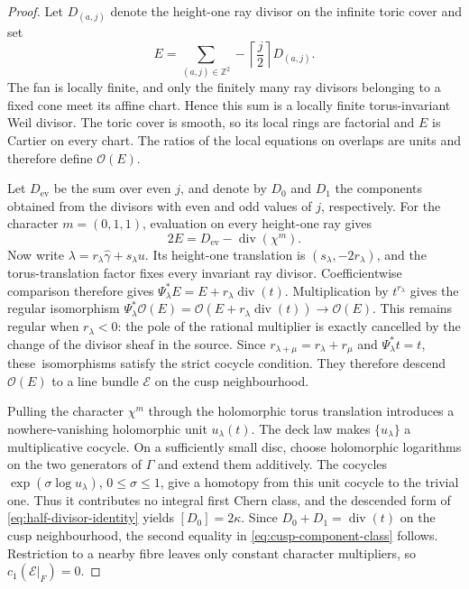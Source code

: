 \documentclass[11pt]{article}
\theoremstyle{definition}
\theoremstyle{remark}
\numberwithin{equation}{section}
\begin{document}
\begin{proof}
Let $D_{(a,j)}$ denote the height-one ray divisor on the infinite toric
cover and set
\[
 E=\sum_{(a,j)\in\mathbb Z^2}
   -\left\lceil\frac j2\right\rceil D_{(a,j)}.
\]
The fan is locally finite, and only the finitely many ray divisors belonging
to a fixed cone meet its affine chart.  Hence this sum is a locally finite
torus-invariant Weil divisor.  The toric cover is smooth, so its local rings
are factorial and $E$ is Cartier on every chart.  The ratios of the local
equations on overlaps are units and therefore define $\mathcal O(E)$.

Let $D_{\mathrm{ev}}$ be the sum over even $j$, and denote by $D_0$
and $D_1$ the components obtained from the divisors with even and odd
values of $j$, respectively.  For the character
$m=(0,1,1)$, evaluation on every height-one ray gives
\begin{equation}\label{eq:half-divisor-identity}
 2E=D_{\mathrm{ev}}-\operatorname{div}(\chi^m).
\end{equation}
Now write $\lambda=r_\lambda\widehat\gamma+s_\lambda u$.  Its height-one translation
is $(s_\lambda,-2r_\lambda)$, and the torus-translation factor fixes every
invariant ray divisor.  Coefficientwise comparison therefore gives
$\Psi_\lambda^*E=E+r_\lambda\operatorname{div}(t)$.
Multiplication by $t^{r_\lambda}$ gives the regular isomorphism
$\Psi_\lambda^*\mathcal O(E)
=\mathcal O(E+r_\lambda\operatorname{div}(t))
\longrightarrow\mathcal O(E)$.
This remains regular when $r_\lambda<0$: the pole of the rational
multiplier is exactly cancelled by the change of the divisor sheaf in the
source.  Since $r_{\lambda+\mu}=r_\lambda+r_\mu$ and
$\Psi_\lambda^*t=t$, these~isomorphisms satisfy the strict cocycle
condition.  They therefore descend $\mathcal O(E)$ to a line bundle
$\mathcal E$ on the cusp neighbourhood.

Pulling the character $\chi^m$ through the holomorphic torus translation
introduces a nowhere-vanishing holomorphic unit $u_\lambda(t)$.  The deck
law makes $\{u_\lambda\}$ a multiplicative cocycle.  On a sufficiently
small disc, choose holomorphic logarithms on the two generators of
$\Gamma$ and extend them additively.  The cocycles
$\exp(\sigma\log u_\lambda)$, $0\leq\sigma\leq1$, give a homotopy from
this unit cocycle to the trivial one.  Thus it contributes no integral first
Chern class, and the descended form of
\eqref{eq:half-divisor-identity} yields $[D_0]=2\kappa$.  Since
$D_0+D_1=\operatorname{div}(t)$ on the cusp neighbourhood, the second equality in
\eqref{eq:cusp-component-class} follows.  Restriction to a nearby fibre
leaves only constant character multipliers, so $c_1(\mathcal E|_F)=0$.


\end{proof}
\end{document}
